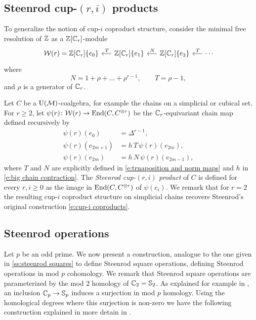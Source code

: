 \subsection{Steenrod cup-$(r,i)$ products} \label{ss:higher cup-i coproducts}

To generalize the notion of cup-$i$ coproduct structure, consider the minimal free resolution of $\mathbb{Z}$ as a $\mathbb{Z}[\mathbb{C}_r]$-module
\begin{equation} \label{e:minimal resolution r>2}
\begin{tikzcd} [column sep = .5cm]
\mathcal W(r) = \Z[\Cyc_r]\{e_0\} & \arrow[l, "\,T"'] \Z[\Cyc_r]\{e_1\} & \arrow[l, "\,N"'] \Z[\Cyc_r]\{e_2\} & \arrow[l, "\,T"'] \cdots
\end{tikzcd}
\end{equation}
where
\begin{equation} \label{e:trnaposition and norm maps}
N = 1 + \rho + \dots + \rho^{r-1}, \qquad
T = \rho - 1,
\end{equation}
and $\rho$ is a generator of $\mathbb{C}_r$.

Let $C$ be a ${\operatorname{U}(\mathcal{M})}$-coalgebra, for example the chains on a simplicial or cubical set.
For $r \geq 2$, let $\psi(r) \colon \mathcal{W}(r) \to \mathrm{End}(C, C^{\otimes r})$ be the $\mathbb{C}_r$-equivariant chain map defined recursively by
\begin{equation}\label{e:definition of psi}
\begin{split}
\psi(r)(e_0) & = \Delta^{r-1}, \\
\psi(r)(e_{2m+1}) & = h\,T\,\psi(r)(e_{2m}), \\
\psi(r)(e_{2m}) & = h\,N\,\psi(r)(e_{2m-1}),
\end{split}
\end{equation}
where $T$ and $N$ are explicitly defined in \eqref{e:trnaposition and norm maps} and $h$ in \eqref{e:big chain contraction}.
The \textit{Steenrod cup-}$(r, i)$ \textit{product} of $C$ is defined for every $r, i \geq 0$ as the image in $\mathrm{End}(C, C^{\otimes r})$ of $\psi(e_i)$.
We remark that for $r = 2$ the resulting cup-$i$ coproduct structure on simplicial chains recovers Steenrod's original construction \eqref{e:cup-i coproducts}.

\subsection{Steenrod operations} \label{ss:steenrod operations}

Let $p$ be an odd prime.
We now present a construction, analogue to the one given in \cref{ss:steenrod squares} to define Steenrod square operations, defining Steenrod operations in mod $p$ cohomology.
We remark that Steenrod square operations are parameterized by the mod $2$ homology of $\mathbb{C}_2 = \mathbb{S}_2$.
As explained for example in \cite[Corollary~VI.1.4]{adem2004milgram}, an inclusion $\mathbb{C}_p \to \mathbb{S}_p$ induces a surjection in mod $p$ homology.
Using the homological degrees where this surjection is non-zero we have the following construction explained in more detain in \cite{steenrod1952reduced, steenrod1953cyclic, may1970general}.

